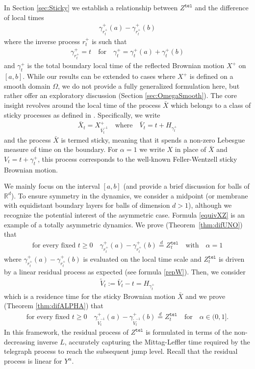 \documentclass[10pt,a4paper]{article}
\numberwithin{equation}{section}
\theoremstyle{plain}
\theoremstyle{remark}
\begin{document}
In Section \ref{sec:Sticky}  we establish a relationship between $Z^\mathtt{tel}$ and the difference of local times 
\begin{align*}
\gamma^+_{r^+_t}(a) - \gamma^+_{r^+_t}(b)
\end{align*}  
where the inverse process $r^+_t$ is such that
\begin{align*}
\gamma^+_{r^+_t} = t \quad \textrm{for} \quad \gamma^+_t = \gamma^+_t(a) + \gamma^+_t(b)
\end{align*}
and $\gamma^+_t$ is the total boundary local time of the reflected Brownian motion $X^+$ on $[a,b]$. While our results can be extended to cases where $X^+$ is defined on a smooth domain $\Omega$, we do not provide a fully generalized formulation here, but rather offer an exploratory discussion (Section \ref{sec:OmegaSmooth}). The core insight revolves around the local time of the process $\bar{X}$ which belongs to a class of sticky processes as defined in \cite{EJP}. Specifically, we write
\begin{align*}
\bar{X}_t = X^+_{\bar{V}^{-1}_t} \quad \textrm{where} \quad \bar{V}_t = t + H_{\gamma^+_t} 
\end{align*} 
and the process $\bar{X}$ is termed sticky, meaning that it spends a non-zero Lebesgue measure of time on the boundary. For $\alpha=1$ we write $X$ in place of $\bar{X}$ and $V_t = t + \gamma^+_t$, this process corresponds to the well-known Feller-Wentzell sticky Brownian motion. 

We mainly focus on the interval $[a,b]$ (and provide a brief discussion for balls of $\mathbb{R}^d$). To ensure symmetry in the dynamics, we consider a midpoint (or membrane with equidistant boundary layers for balls of dimension $d>1$), although we recognize the potential interest of the asymmetric case. Formula \eqref{equivXZ} is an example of a totally asymmetric dynamics. We prove (Theorem~\ref{thm:difUNO}) that
\begin{align*}
\textrm{for every fixed $t\geq 0$} \quad \gamma^+_{r^+_t}(a) - \gamma^+_{r^+_t}(b) \stackrel{d}{=} Z^\mathtt{tel}_t  \quad \textrm{with} \quad \alpha =1
\end{align*}
where $\gamma^+_{r^+_t}(a) - \gamma^+_{r^+_t}(b)$ is evaluated on the local time scale and $Z^\mathtt{tel}_t$ is driven by a linear residual process as expected (see formula \eqref{repW}). Then, we consider
\begin{align*}
\tilde{V}_t := \bar{V}_t - t = H_{\gamma^+_t}
\end{align*}
which is a residence time for the sticky Brownian motion $\bar{X}$ and
we prove (Theorem \ref{thm:difALPHA}) that
\begin{align*}
\textrm{for every fixed $t\geq 0$} \quad  \gamma^+_{\tilde{V}^{-1}_t}(a) - \gamma^+_{\tilde{V}^{-1}_t}(b) \stackrel{d}{=} Z^\mathtt{tel}_t  \quad \textrm{for} \quad \alpha \in (0,1].
\end{align*}
In this framework, the residual process of $Z^\mathtt{tel}$ is formulated in terms of the non-decreasing inverse $L$, accurately capturing the Mittag-Leffler time required by the telegraph process to reach the subsequent jump level. Recall that the residual process is linear for $Y^\alpha$. \\
\end{document}
